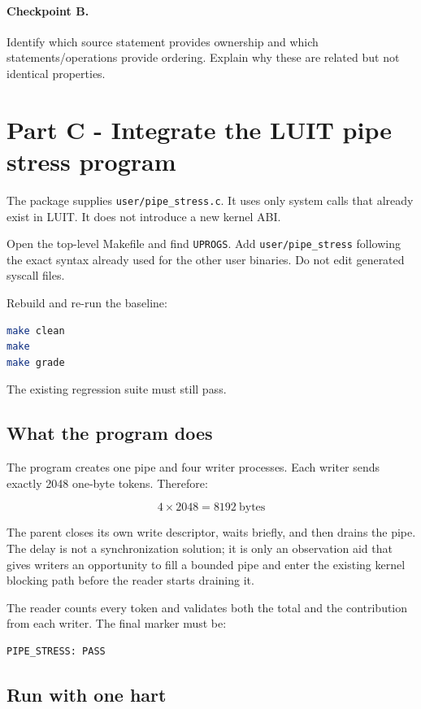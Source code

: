 \documentclass[11pt,a4paper]{article}
\newcommand{\file}[1]{\texttt{#1}}
\begin{document}
\paragraph{Checkpoint B.} Identify which source statement provides ownership and which statements/operations provide ordering. Explain why these are related but not identical properties.

\section{Part C - Integrate the LUIT pipe stress program}

The package supplies \file{user/pipe\_stress.c}. It uses only system calls that already exist in LUIT. It does not introduce a new kernel ABI.

Open the top-level Makefile and find \file{UPROGS}. Add \file{user/pipe\_stress} following the exact syntax already used for the other user binaries. Do not edit generated syscall files.

Rebuild and re-run the baseline:

\begin{lstlisting}[language=bash]
make clean
make
make grade
\end{lstlisting}

The existing regression suite must still pass.

\subsection{What the program does}

The program creates one pipe and four writer processes. Each writer sends exactly 2048 one-byte tokens. Therefore:

\[
4 \times 2048 = 8192\ \text{bytes}
\]

The parent closes its own write descriptor, waits briefly, and then drains the pipe. The delay is not a synchronization solution; it is only an observation aid that gives writers an opportunity to fill a bounded pipe and enter the existing kernel blocking path before the reader starts draining it.

The reader counts every token and validates both the total and the contribution from each writer. The final marker must be:

\begin{lstlisting}
PIPE_STRESS: PASS
\end{lstlisting}

\subsection{Run with one hart}
\end{document}
